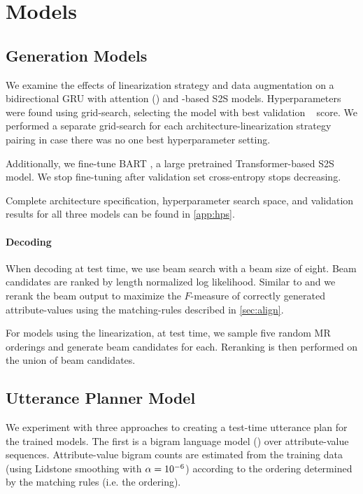 \section{Models}

\subsection{Generation Models}

We examine the effects of linearization strategy and data augmentation on a
bidirectional GRU with attention (\biGRU) and \Transformer-based S2S models.
Hyperparameters were found using grid-search, selecting the model with best
validation \bleu~\cite{papineni2002} score. We performed a separate
grid-search for each architecture-linearization strategy pairing in case there
was no one best hyperparameter setting.  

Additionally, we fine-tune BART \cite{lewis2020}, a large pretrained
Transformer-based S2S model. We stop fine-tuning after validation set
cross-entropy stops decreasing.

Complete architecture specification, hyperparameter search space, and
validation results for all three models can be found in \autoref{app:hps}.

\paragraph{Decoding}

When decoding at test time, we use beam search with a beam size of eight.
Beam candidates are ranked by length normalized log likelihood.  Similar to
\citet{dusek2019} and \citet{juraska2019} we rerank the beam output to
maximize the $F$-measure of correctly generated attribute-values using the
matching-rules described in \autoref{sec:align}.

For models using the   linearization, at test time, we sample
five random MR orderings and generate beam candidates for each. Reranking is
then performed on the union of beam candidates. 

\subsection{Utterance Planner Model} We experiment with three approaches to
creating a test-time utterance plan for the  trained models. The
first is a bigram language model (\BgUP) over attribute-value sequences.
Attribute-value bigram counts are estimated from the training data 
(using Lidstone smoothing \cite{chen1996} with $\alpha=10^{-6}$)  according to the
ordering determined by the matching rules (i.e. the  ordering). 

